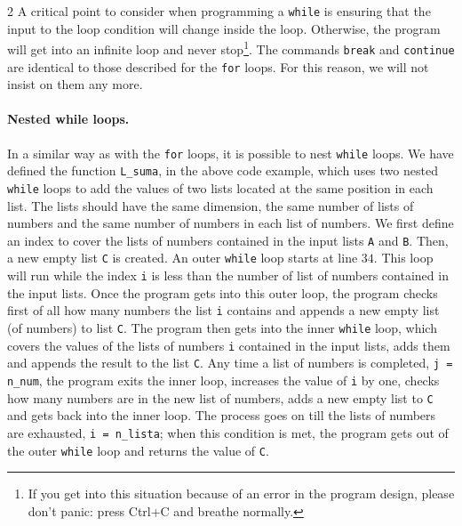 \begin{paracol}{2}
A critical point to consider when programming a \texttt{while} is ensuring that the input to the loop condition will change inside the loop. Otherwise, the program will get into an infinite loop and never stop\footnote{If you get into this situation because of an error in the program design, please don't panic: press Ctrl+C and breathe normally.}. The commands \texttt{break} and \texttt{continue} are identical to those described for the \texttt{for} loops. For this reason, we will not insist on them any more. 

\paragraph{Nested while loops.} In a similar way as with the \texttt{for} loops, it is possible to nest \texttt{while} loops. We have defined the function \texttt{L_suma}, in the above code example, which uses two nested \texttt{while} loops to add the values of two lists located at the same position in each list. The lists should have the same dimension, the same number of lists of numbers and the same number of numbers in each list of numbers. We first define an index to cover the lists of numbers contained in the input lists \texttt{A} and \texttt{B}. Then, a new empty list \texttt{C} is created. An outer \texttt{while} loop starts at line $34$. This loop will run while the index \texttt{i} is less than the number of list of numbers contained in the input lists. Once the program gets into this outer loop, the program checks first of all how many numbers the list \texttt{i} contains and appends a new empty list (of numbers) to list \texttt{C}. The program then gets into the inner \texttt{while} loop, which covers the values of the lists of numbers \texttt{i} contained in the input lists, adds them and appends the result to the list \texttt{C}. Any time a list of numbers is completed, \texttt{j = n_num}, the program exits the inner loop, increases the value of \texttt{i} by one, checks how many numbers are in the new list of numbers, adds a new empty list to \texttt{C} and gets back into the inner loop. The process goes on till the lists of numbers are exhausted, \texttt{i = n_lista}; when this condition is met, the program gets out of the outer \texttt{while} loop and returns the value of \texttt{C}.
\end{paracol}

